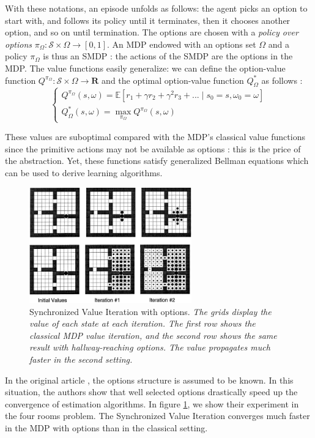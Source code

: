 \documentclass{article}
\newcommand{\Rr}{\mathbf{R}}
\newcommand{\Ee}{\mathbb{E}}
\begin{document}
With these notations, an episode unfolds as follows: the agent picks an option to start with, and follows its policy until it terminates, then it chooses another option, and so on until termination. The options are chosen with a \textit{policy over options} $\pi_\Omega : \mathcal{S} \times \Omega \rightarrow [0, 1]$. An MDP endowed with an options set $\Omega$ and a policy $\pi_\Omega$ is thus an SMDP : the actions of the SMDP are the options in the MDP.
The value functions easily generalize: we can define the option-value function $Q^{\pi_\Omega} : \mathcal{S} \times \Omega \rightarrow \Rr$ and the optimal option-value function $Q^*_\Omega$ as follows :
\begin{equation}
\begin{cases}
Q^{\pi_\Omega}(s, \omega) = \Ee[r_1 + \gamma r_2 + \gamma^2 r_3 +  ... \mid s_0 = s, \omega_0 = \omega] \\
Q^*_\Omega(s, \omega) = \max_{\pi_\Omega} Q^{\pi_\Omega}(s, \omega)
\end{cases}
\end{equation}

These values are suboptimal compared with the MDP's classical value functions since the primitive actions may not be available as options : this is the price of the abstraction. Yet, these functions satisfy generalized Bellman equations which can be used to derive learning algorithms.

\begin{figure}
    \centering
    \includegraphics[width=7cm]{images/SVI_options.png}
    \caption{Synchronized Value Iteration with options. \small \it The grids display the value of each state at each iteration. The first row shows the classical MDP value iteration, and the second row shows the same result with hallway-reaching options. The value propagates much faster in the second setting.}
    \label{fig:svi}
    \vspace{-1cm}
\end{figure}

In the original article \cite{sutton_between_1999}, the options structure is assumed to be known. In this situation, the authors show that well selected options drastically speed up the convergence of estimation algorithms. In figure \ref{fig:svi}, we show their experiment in the four rooms problem. The Synchronized Value Iteration converges much faster in the MDP with options than in the classical setting.
\end{document}
